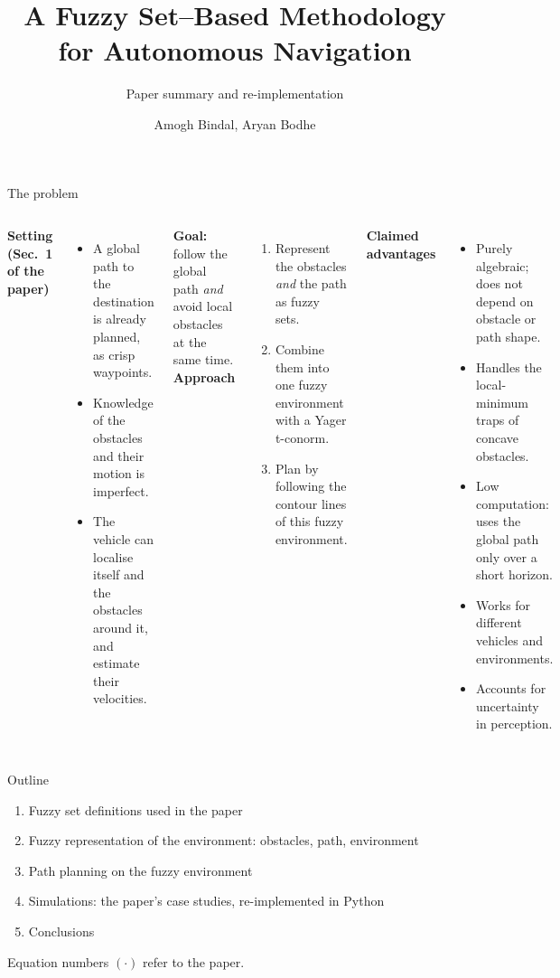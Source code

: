 \documentclass[9pt,aspectratio=169]{beamer}
\title{A Fuzzy Set--Based Methodology for Autonomous Navigation}
\subtitle{Paper summary and re-implementation}
\institute{Paper: E.\,A.~Rastkhiz, H.~Schwartz, I.~Lambadaris, \emph{Fuzzy Sets and Systems} 518 (2025) 109485}
\author{Amogh Bindal, Aryan Bodhe}
\date{}
\begin{document}
\maketitle

\begin{frame}{The problem}
\small
\begin{columns}[T]
\textbf{Setting (Sec.~1 of the paper)}
\begin{itemize}
  \item A global path to the destination is already planned, as crisp waypoints.
  \item Knowledge of the obstacles and their motion is imperfect.
  \item The vehicle can localise itself and the obstacles around it, and estimate their velocities.
\end{itemize}
\textbf{Goal:} follow the global path \emph{and} avoid local obstacles at the same time.
\textbf{Approach}
\begin{enumerate}
  \item Represent the obstacles \emph{and} the path as fuzzy sets.
  \item Combine them into one fuzzy environment with a Yager t-conorm.
  \item Plan by following the contour lines of this fuzzy environment.
\end{enumerate}
\medskip
\textbf{Claimed advantages}
\begin{itemize}\small
  \item Purely algebraic; does not depend on obstacle or path shape.
  \item Handles the local-minimum traps of concave obstacles.
  \item Low computation: uses the global path only over a short horizon.
  \item Works for different vehicles and environments.
  \item Accounts for uncertainty in perception.
\end{itemize}
\end{columns}
\end{frame}

\begin{frame}{Outline}
\begin{enumerate}
  \item Fuzzy set definitions used in the paper
  \item Fuzzy representation of the environment: obstacles, path, environment
  \item Path planning on the fuzzy environment
  \item Simulations: the paper's case studies, re-implemented in Python
  \item Conclusions
\end{enumerate}
\vfill
\small Equation numbers $(\cdot)$ refer to the paper.
\end{frame}
\end{document}
